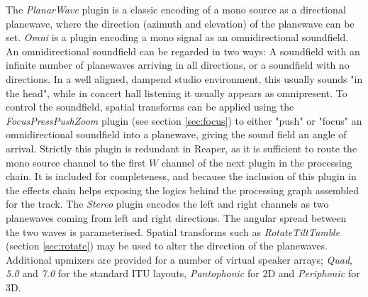 \documentclass{article}
\begin{document}
The \emph{PlanarWave} plugin is a classic encoding of a mono source as a directional plane\-wave, where the direction (azimuth and elevation) of the planewave can be set.
\emph{Omni} is a plugin encoding a mono signal as an omnidirectional soundfield.
An omnidirectional soundfield can be regarded in two ways:
A soundfield with an infinite number of plane\-waves arriving in all directions, or a soundfield with no directions. In a well aligned, dampend studio environment, this usually sounds "in the head", while in concert hall listening it usually appears as omnipresent.
To control the soundfield, spatial transforms can be applied using the \emph{FocusPressPushZoom} plugin (see section \ref{sec:focus}) to either "push" or "focus" an omnidirectional soundfield into a plane\-wave, giving the sound field an angle of arrival.
Strictly this plugin is redundant in Reaper, as it is sufficient to route the mono source channel to the first $W$ channel of the next plugin in the processing chain.
It is included for completeness, and because the inclusion of this plugin in the effects chain helps exposing the logics behind the processing graph assembled for the track.
The \emph{Stereo} plugin encodes the left and right channels as two planewaves coming from left and right directions. The angular spread between the two waves is parameterised.
Spatial transforms such as \emph{RotateTiltTumble} (section \ref{sec:rotate}) may be used to alter the direction of the planewaves.
Additional upmixers are provided for a number of virtual spea\-ker arrays; \emph{Quad}, \emph{5.0} and \emph{7.0} for the standard ITU layouts, \emph{Pantophonic} for 2D and \emph{Periphonic} for 3D.
\end{document}
